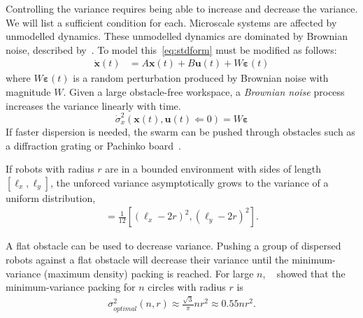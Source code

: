 Controlling the variance requires being able to increase and decrease the variance.  We will list a sufficient condition for each. 
Microscale systems are affected by unmodelled dynamics. 
These unmodelled dynamics are dominated by Brownian noise, described by~\cite{einstein1956investigations}. 
To model this~\eqref{eq:stdform} must be modified as follows:
\begin{align}
\dot{\mathbf{x}}(t)  &=  A \mathbf{x}(t) + B \mathbf{u}(t) + W \bm{\varepsilon}(t)
\end{align}
where $W\bm{\varepsilon}(t)$ is a random perturbation produced by Brownian noise with magnitude $W$. Given a large obstacle-free workspace, a \emph{Brownian noise} process increases the variance linearly with time.
\begin{equation}\dot{\sigma}_x^2(\mathbf{x}(t), \mathbf{u}(t) \Leftarrow 0)  = W \bm{\varepsilon} \end{equation}
 If faster dispersion is needed, the swarm can be pushed through obstacles such as a diffraction grating or Pachinko board~\cite{Becker2013b}. 

If robots with radius $r$ are in a bounded environment with sides of length $[\ell_x, \ell_y]$, the unforced variance asymptotically grows to the variance of a uniform distribution,
\begin{align}
[\sigma_x^2,\sigma_y^2] = \frac{1}{12}[ (\ell_x - 2 r)^2,(\ell_y - 2 r)^2].\label{eq:VarianceUniformDistribution}
\end{align}

 A flat obstacle can be used to decrease variance. Pushing a group of dispersed robots against a flat obstacle will decrease their variance until the minimum-variance (maximum density) packing  is reached. For large $n$, ~\cite{graham1990penny} showed that the minimum-variance packing  for $n$ circles with radius $r$ is 
 \begin{align} \label{eq:optimalvar}
 \sigma^2_{optimal}(n,r) \approx   \frac{\sqrt{3}}{\pi} n r^2\approx 0.55 n r^2.
 \end{align} 

